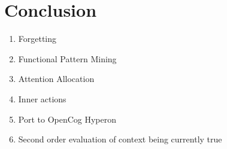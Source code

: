 \documentclass[runningheads]{llncs}
\begin{document}
\section{Conclusion}

\begin{enumerate}
\item Forgetting
\item Functional Pattern Mining
\item Attention Allocation
\item Inner actions
\item Port to OpenCog Hyperon
\item Second order evaluation of context being currently true
\end{enumerate}

%
%
 
\end{document}
